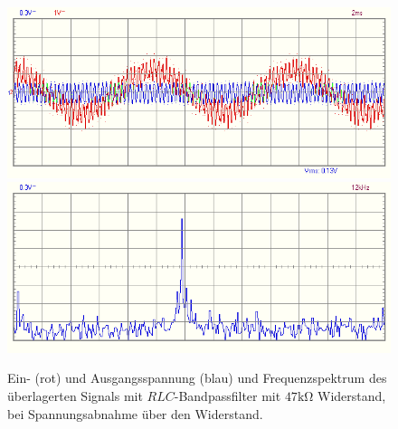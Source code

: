 \begin{figure}[H]
  \centering
  \includegraphics[width=.9\textwidth]{files/aufgabe8_teil3_clR_47ohm_bandpass_oszi.png}
  \includegraphics[width=.9\textwidth]{files/aufgabe8_teil3_clR_47ohm_bandpass_spectrum.png}
  \caption{Ein- (rot) und Ausgangsspannung (blau) und Frequenzspektrum des überlagerten Signals mit $RLC$-Bandpassfilter mit $47\si{\kilo\ohm}$ Widerstand, bei Spannungsabnahme über den Widerstand.}
  \label{fig:aufgabe8_teil3_clR_47ohm_bandpass}
\end{figure}